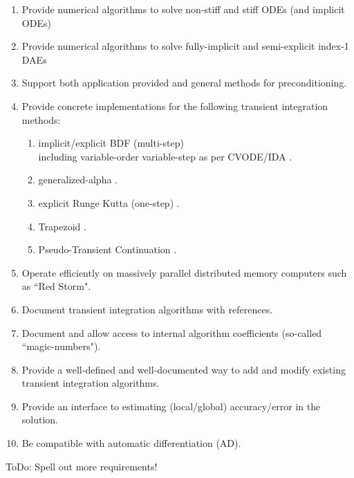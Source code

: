 \documentclass[pdf,ps2pdf,11pt]{SANDreport}
\begin{document}
\begin{enumerate}
{}\item Provide numerical algorithms to solve non-stiff and stiff ODEs (and implicit ODEs)

{}\item Provide numerical algorithms to solve fully-implicit and semi-explicit index-1 DAEs

{}\item Support both application provided and general methods for preconditioning.

{}\item Provide concrete implementations for the following transient integration methods:
  \begin{enumerate}
  {}\item implicit/explicit BDF (multi-step) \\
        including variable-order variable-step as per CVODE/IDA \cite{CVODE,IDA}.
  {}\item generalized-alpha \cite{GeneralizedAlpha}.
  {}\item explicit Runge Kutta (one-step) \cite{ERKMethods}.
  {}\item Trapezoid \cite{Trapezoid}.
  {}\item Pseudo-Transient Continuation \cite{PTC,PTCDAE}.
  \end{enumerate}

{}\item Operate efficiently on massively parallel distributed memory
computers such as ``Red Storm".

{}\item Document transient integration algorithms with references.

{}\item Document and allow access to internal algorithm coefficients
(so-called ``magic-numbers").

{}\item Provide a well-defined and well-documented way to add and
modify existing transient integration algorithms.

{}\item Provide an interface to estimating (local/global)
accuracy/error in the solution.

{}\item Be compatible with automatic differentiation (AD).

\end{enumerate}

ToDo: Spell out more requirements!
\end{document}
